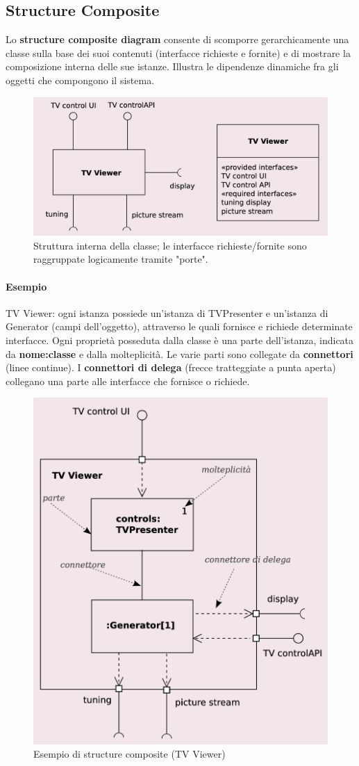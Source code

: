 \subsection{Structure Composite}

Lo \textbf{structure composite diagram} consente di scomporre gerarchicamente una classe sulla base dei suoi contenuti (interfacce richieste e fornite) e di mostrare la composizione interna delle sue istanze. Illustra le dipendenze dinamiche fra gli oggetti che compongono il sistema.

\begin{figure}[H]
    \centering
    \includegraphics[width=0.75\linewidth]{assets/UML/struct_comp/struct_comp.png}
    \caption{Struttura interna della classe; le interfacce richieste/fornite sono raggruppate logicamente tramite "porte".}
\end{figure}

\paragraph{Esempio} TV Viewer: ogni istanza possiede un'istanza di TVPresenter e un'istanza di Generator (campi dell'oggetto), attraverso le quali fornisce e richiede determinate interfacce. Ogni proprietà posseduta dalla classe è una parte dell'istanza, indicata da \textbf{nome:classe} e dalla molteplicità. Le varie parti sono collegate da \textbf{connettori} (linee continue). I \textbf{connettori di delega} (frecce tratteggiate a punta aperta) collegano una parte alle interfacce che fornisce o richiede.

\begin{figure}[H]
    \centering
    \includegraphics[width=0.4\linewidth]{assets/UML/struct_comp/struct_comp2.png}
    \caption{Esempio di structure composite (TV Viewer)}
\end{figure}

\newpage